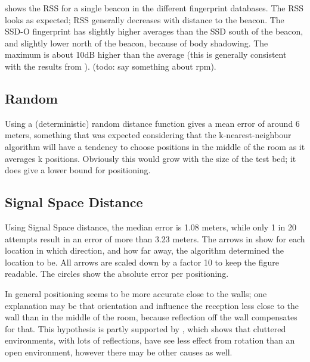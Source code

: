  shows the RSS for a single beacon in the different fingerprint databases.
The RSS looks as expected; RSS generally decreases with distance to the beacon.
The SSD-O fingerprint has slightly higher averages than the SSD south of the beacon, and slightly lower north of the beacon, because of body shadowing.
The maximum is about 10dB higher than the average (this is generally consistent with the results from ).
(todo: say something about rpm).


\subsection{Random}
Using a (deterministic) random distance function gives a mean error of around 6 meters, something that was expected considering that the k-nearest-neighbour algorithm will have a tendency to choose positions in the middle of the room as it averages k positions.
Obviously this would grow with the size of the test bed; it does give a lower bound for positioning.
\subsection{Signal Space Distance}
Using Signal Space distance, the median error is 1.08 meters, while only 1 in 20 attempts result in an error of more than 3.23 meters.
The arrows in  show for each location in which direction, and how far away, the algorithm determined the location to be.
All arrows are scaled down by a factor 10 to keep the figure readable.
The circles show the absolute error per positioning.

In general positioning seems to be more accurate close to the walls; one explanation may be that orientation and \mpi influence the reception less close to the wall than in the middle of the room, because reflection off the wall compensates for that.
This hypothesis is partly supported by , which shows that cluttered environments, with lots of reflections, have see less effect from rotation than an open environment, however there may be other causes as well.


